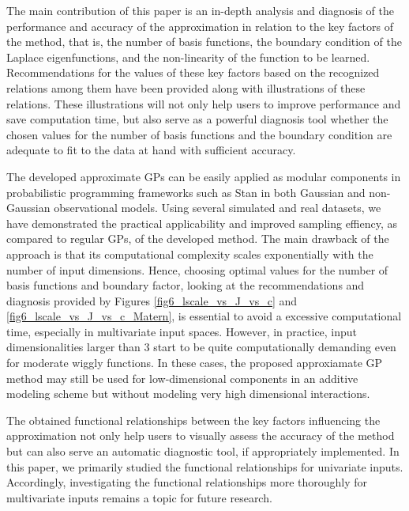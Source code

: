 \documentclass[onecolumn,a4paper,11pt]{article}
\begin{document}

The main contribution of this paper is an in-depth analysis and diagnosis of the performance and accuracy of the approximation in relation to the key factors of the method, that is, the number of basis functions, the boundary condition of the Laplace eigenfunctions, and the non-linearity of the function to be learned. Recommendations for the values of these key factors based on the recognized relations among them have been provided along with illustrations of these relations. These illustrations will not only help users to improve performance and save computation time, but also serve as a powerful diagnosis tool whether the chosen values for the number of basis functions and the boundary condition are adequate to fit to the data at hand with sufficient accuracy.

The developed approximate GPs can be easily applied as modular components in probabilistic programming frameworks such as Stan in both Gaussian and non-Gaussian observational models. Using several simulated and real datasets, we have demonstrated the practical applicability and improved sampling effiency, as compared to regular GPs, of the developed method.
The main drawback of the approach is that its computational complexity scales exponentially with the number of input dimensions. {\color{red}Hence, choosing optimal values for the number of basis functions and boundary factor, looking at the recommendations and diagnosis provided by Figures \ref{fig6_lscale_vs_J_vs_c} and \ref{fig6_lscale_vs_J_vs_c_Matern}, is essential to avoid a excessive computational time, especially in multivariate input spaces. However, in practice, input dimensionalities larger than 3 start to be quite computationally demanding even for moderate wiggly functions.} In these cases, the proposed approxiamate GP method may still be used for low-dimensional components in an additive modeling scheme but without modeling very high dimensional interactions.

The obtained functional relationships between the key factors influencing the approximation not only help users to visually assess the accuracy of the method
but can also serve an automatic diagnostic tool, if appropriately implemented.
In this paper, we primarily studied the functional relationships for univariate inputs. Accordingly, investigating the functional relationships more thoroughly for multivariate inputs remains a topic for future research. 
\end{document}
